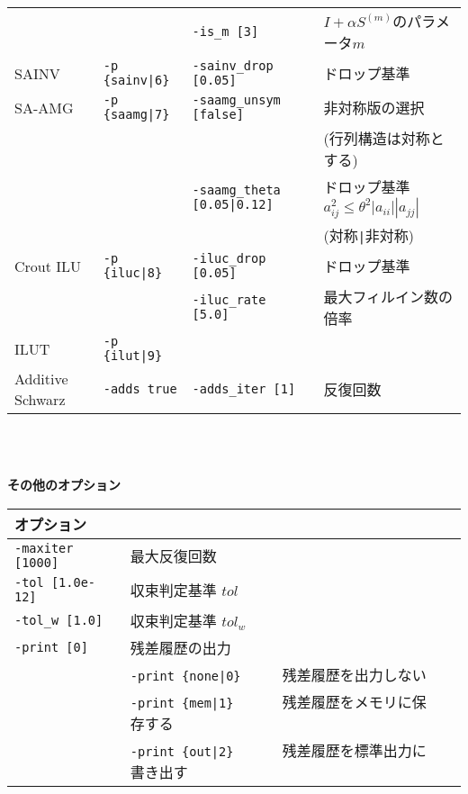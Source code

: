 \documentclass[a4paper]{jarticle}
\begin{document}
{{\begin{minipage}[t]{\textwidth}
\begin{center}
\begin{tabular}{l|lll}
         &                       & \verb=-is_m [3]=        & $I+\alpha S^{(m)}$のパラメータ$m$ \\
SAINV    & \verb=-p {sainv|6}=   & \verb=-sainv_drop [0.05]=    & ドロップ基準\\
SA-AMG   & \verb=-p {saamg|7}=   & \verb=-saamg_unsym [false]=     & 非対称版の選択 \\
         &                       &                                 & (行列構造は対称とする) \\
         &                       & \verb=-saamg_theta [0.05|0.12]= & ドロップ基準 $a^2_{ij}\le\theta^2|a_{ii}||a_{jj}|$ \\
         &                       &                             & (対称\verb=|=非対称) \\
Crout ILU& \verb=-p {iluc|8}=    & \verb=-iluc_drop [0.05]=    & ドロップ基準    \\
         &                       & \verb=-iluc_rate [5.0]=     & 最大フィルイン数の倍率 \\
ILUT     & \verb=-p {ilut|9}=    &     \\
Additive Schwarz  & \verb=-adds true=   &  \verb=-adds_iter [1]= & 反復回数   \\
\hline         
\end{tabular}
\end{center}
\end{minipage}
\\ \\
\begin{minipage}[t]{\textwidth}
\begin{center}
{\bf その他のオプション}\\
\begin{tabular}{l|ll}\hline\hline
オプション &                          \\ \hline
\verb=-maxiter [1000]= & 最大反復回数         \\ 
\verb=-tol [1.0e-12]=  & 収束判定基準 $tol$             \\
\verb=-tol_w [1.0]=    & 収束判定基準 $tol_w$           \\
\verb=-print [0]=      & 残差履歴の出力                 \\
                       & \verb=-print {none|0}     =  残差履歴を出力しない \\
                       & \verb=-print {mem|1}      =  残差履歴をメモリに保存する\\
                       & \verb=-print {out|2}      =  残差履歴を標準出力に書き出す\\

\end{tabular}
\end{center}
\end{minipage}}}
\end{document}
